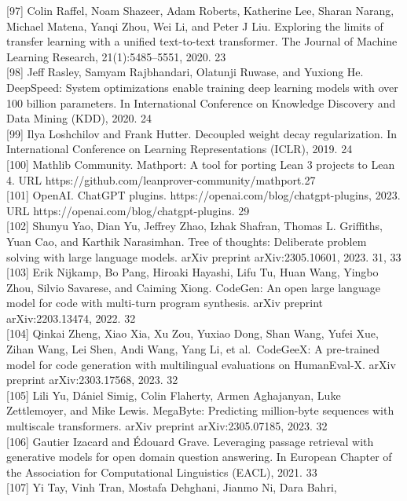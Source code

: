 \documentclass[
]{article}
\begin{document}
{[}97{]} Colin Raffel, Noam Shazeer, Adam Roberts, Katherine Lee, Sharan
Narang, Michael Matena, Yanqi Zhou, Wei Li, and Peter J Liu. Exploring
the limits of transfer learning with a unified text-to-text transformer.
The Journal of Machine Learning Research, 21(1):5485--5551, 2020. 23\\
{[}98{]} Jeff Rasley, Samyam Rajbhandari, Olatunji Ruwase, and Yuxiong
He. DeepSpeed: System optimizations enable training deep learning models
with over 100 billion parameters. In International Conference on
Knowledge Discovery and Data Mining (KDD), 2020. 24\\
{[}99{]} Ilya Loshchilov and Frank Hutter. Decoupled weight decay
regularization. In International Conference on Learning Representations
(ICLR), 2019. 24\\
{[}100{]} Mathlib Community. Mathport: A tool for porting Lean 3
projects to Lean 4. URL
https://github.com/leanprover-community/mathport.27\\
{[}101{]} OpenAI. ChatGPT plugins.
https://openai.com/blog/chatgpt-plugins, 2023. URL
https://openai.com/blog/chatgpt-plugins. 29\\
{[}102{]} Shunyu Yao, Dian Yu, Jeffrey Zhao, Izhak Shafran, Thomas L.
Griffiths, Yuan Cao, and Karthik Narasimhan. Tree of thoughts:
Deliberate problem solving with large language models. arXiv preprint
arXiv:2305.10601, 2023. 31, 33\\
{[}103{]} Erik Nijkamp, Bo Pang, Hiroaki Hayashi, Lifu Tu, Huan Wang,
Yingbo Zhou, Silvio Savarese, and Caiming Xiong. CodeGen: An open large
language model for code with multi-turn program synthesis. arXiv
preprint arXiv:2203.13474, 2022. 32\\
{[}104{]} Qinkai Zheng, Xiao Xia, Xu Zou, Yuxiao Dong, Shan Wang, Yufei
Xue, Zihan Wang, Lei Shen, Andi Wang, Yang Li, et al.~CodeGeeX: A
pre-trained model for code generation with multilingual evaluations on
HumanEval-X. arXiv preprint arXiv:2303.17568, 2023. 32\\
{[}105{]} Lili Yu, Dániel Simig, Colin Flaherty, Armen Aghajanyan, Luke
Zettlemoyer, and Mike Lewis. MegaByte: Predicting million-byte sequences
with multiscale transformers. arXiv preprint arXiv:2305.07185, 2023.
32\\
{[}106{]} Gautier Izacard and Édouard Grave. Leveraging passage
retrieval with generative models for open domain question answering. In
European Chapter of the Association for Computational Linguistics
(EACL), 2021. 33\\
{[}107{]} Yi Tay, Vinh Tran, Mostafa Dehghani, Jianmo Ni, Dara Bahri,
\end{document}

